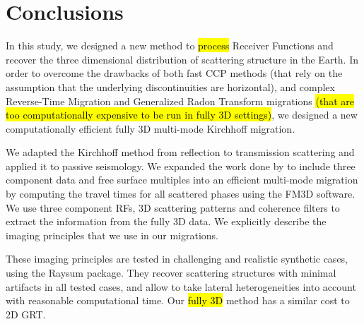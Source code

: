 \documentclass[10pt,a4paper]{article}
\begin{document}


\section{Conclusions}

In this study, we designed a new method to \hl{process} Receiver Functions and recover the three dimensional distribution of scattering structure in the Earth.
In order to overcome the drawbacks of both fast CCP methods (that rely on the assumption that the underlying discontinuities are horizontal), and complex Reverse-Time Migration and Generalized Radon Transform migrations \hl{(that are too computationally expensive to be run in fully 3D settings)}, we designed a new computationally efficient fully 3D multi-mode Kirchhoff migration. %

We adapted the Kirchhoff method from reflection to transmission scattering and applied it to passive seismology.
We expanded the work done by \citet{cheng_gji_16} to include three component data and free surface multiples into an efficient multi-mode migration by computing the travel times for all scattered phases using the FM3D software.
We use three component RFs, 3D scattering patterns and coherence filters to extract the information from the fully 3D data.
We explicitly describe the imaging principles that we use in our migrations.

These imaging principles are tested in challenging and realistic synthetic cases, using the Raysum package.
They recover scattering structures with minimal artifacts in all tested cases, and allow to take lateral heterogeneities into account with reasonable computational time.
Our \hl{fully 3D} method has a similar cost to 2D GRT.
\end{document}

